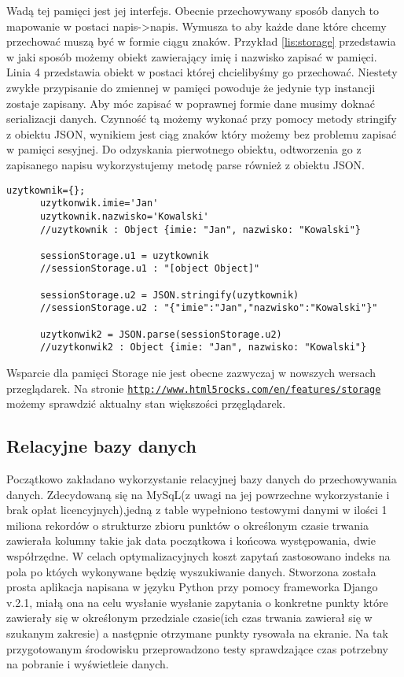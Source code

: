 Wadą tej pamięci jest jej interfejs. Obecnie przechowywany sposób danych to mapowanie w postaci napis->napis. Wymusza to aby każde dane które chcemy przechować muszą być w formie ciągu znaków. Przykład \ref{lis:storage} przedstawia w jaki sposób możemy obiekt zawierający imię i nazwisko zapisać w pamięci. Linia 4 przedstawia obiekt w postaci której chcielibyśmy go przechować. Niestety zwykłe przypisanie do zmiennej w pamięci powoduje że jedynie typ instancji zostaje zapisany. Aby móc zapisać w poprawnej formie dane musimy doknać serializacji danych. Czynność tą możemy wykonać przy pomocy metody stringify z obiektu JSON, wynikiem jest ciąg znaków który możemy bez problemu zapisać w pamięci sesyjnej. Do odzyskania pierwotnego obiektu, odtworzenia go z zapisanego napisu wykorzystujemy metodę parse również z obiektu JSON.

\lstset{language=JavaScript}
\label{lis:storage}
\begin{lstlisting}[caption=json]
      uzytkownik={};
      uzytkonwik.imie='Jan'
      uzytkownik.nazwisko='Kowalski'
      //uzytkownik : Object {imie: "Jan", nazwisko: "Kowalski"}

      sessionStorage.u1 = uzytkownik
      //sessionStorage.u1 : "[object Object]"

      sessionStorage.u2 = JSON.stringify(uzytkownik)
      //sessionStorage.u2 : "{"imie":"Jan","nazwisko":"Kowalski"}"

      uzytkonwik2 = JSON.parse(sessionStorage.u2)
      //uzytkonwik2 : Object {imie: "Jan", nazwisko: "Kowalski"}
\end{lstlisting}



Wsparcie dla pamięci Storage nie jest obecne zazwyczaj w nowszych wersach przeglądarek. Na stronie \underline{\texttt{http://www.html5rocks.com/en/features/storage}} możemy sprawdzić aktualny stan większości przęglądarek.


\subsection{Relacyjne bazy danych}
\label{sec:relacyjne}

Początkowo zakładano wykorzystanie relacyjnej bazy danych do przechowywania danych.
Zdecydowaną się na MySqL(z uwagi na jej powrzechne wykorzystanie i brak opłat licencyjnych),jedną z table wypełniono testowymi danymi w ilości 1 miliona rekordów o strukturze zbioru punktów o określonym czasie trwania zawierała kolumny takie jak data początkowa i końcowa występowania, dwie współrzędne. W celach optymalizacyjnych koszt zapytań zastosowano indeks na pola po któych wykonywane będzię wyszukiwanie danych.
Stworzona została prosta aplikacja napisana w języku Python przy pomocy frameworka Django v.2.1, miałą ona na celu wysłanie wysłanie zapytania o konkretne punkty które zawierały się w okreśłonym przedziale czasie(ich czas trwania zawierał się w szukanym zakresie) a następnie otrzymane punkty rysowała na ekranie. Na tak przygotowanym środowisku przeprowadzono testy sprawdzające czas potrzebny na pobranie i wyświetleie danych.

